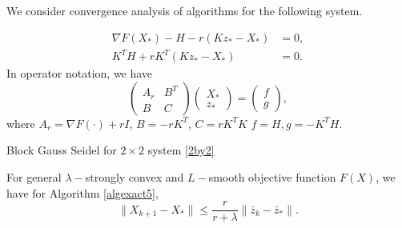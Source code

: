 \begin{itemize}
We consider convergence analysis of algorithms for the following system.

\begin{equation} \label{2by2}
\begin{aligned}
\nabla F(X_{*}) - H - r (Kz_{*} - X_{*}) &= 0, \\
K^T H + r K^T (Kz_{*} - X_{*}) &= 0.
\end{aligned}
\end{equation}
In operator notation, we have 
\begin{equation}
\begin{pmatrix}\label{2by2abstract}
A_r & B^T\\
B & C
\end{pmatrix} 
\begin{pmatrix}
X_*\\
z_*
\end{pmatrix}= 
\begin{pmatrix}
f  \\
g 
\end{pmatrix},
\end{equation}
where $A_r = \nabla F(\cdot) + r I $, $B = -r K^T$, $C = rK^T K $ $f = H, g = -K^T H$. 


\begin{algorithm}
\caption{Block Gauss Seidel for $2 \times 2$ system \eqref{2by2}}
\label{algexact5}
\begin{algorithmic}
\EndFor
\end{algorithmic}
\end{algorithm}

\begin{theorem}
For general $\lambda-$strongly convex and $L-$smooth objective function $F(X)$, we have for Algorithm \ref{algexact5}, 
\begin{equation}
    \|X_{k+1} - X_{*} \| \leq \frac{r}{r + \lambda} \| \bar{z}_k - \bar{z}_* \|.
\end{equation}
\end{theorem}


\end{itemize}
